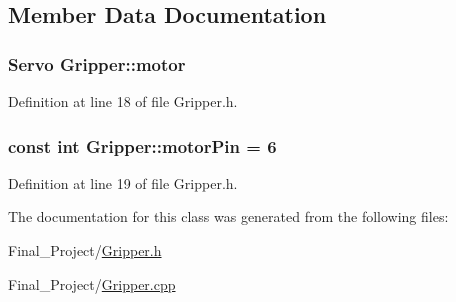 \subsection{Member Data Documentation}
\hypertarget{classGripper_ad72d0ae4ccd2be00ec3f303e7a0c1cc9}{
\subsubsection[{motor}]{\setlength{\rightskip}{0pt plus 5cm}Servo Gripper\-::motor}}\label{classGripper_ad72d0ae4ccd2be00ec3f303e7a0c1cc9}


Definition at line 18 of file Gripper.\-h.

\hypertarget{classGripper_ae12467d04d155401f1c6ba694b295f40}{
\subsubsection[{motor\-Pin}]{\setlength{\rightskip}{0pt plus 5cm}const int Gripper\-::motor\-Pin = 6\hspace{0.3cm}{\ttfamily [static]}}}\label{classGripper_ae12467d04d155401f1c6ba694b295f40}


Definition at line 19 of file Gripper.\-h.



The documentation for this class was generated from the following files\-:\begin{DoxyCompactItemize}
\item 
Final\-\_\-\-Project/\hyperlink{Gripper_8h}{Gripper.\-h}\item 
Final\-\_\-\-Project/\hyperlink{Gripper_8cpp}{Gripper.\-cpp}\end{DoxyCompactItemize}

